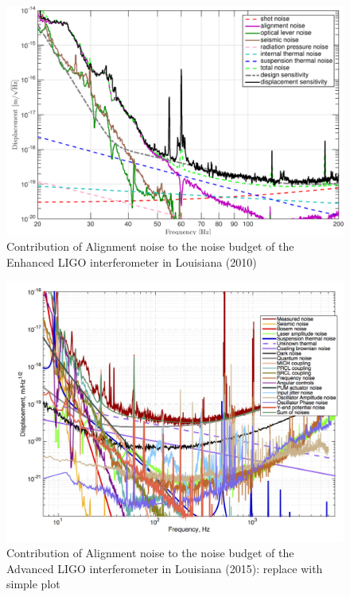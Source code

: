 \begin{figure}[h]
  \centering
    \includegraphics[width=\columnwidth]{Figures/S6_NB.pdf}
    \caption{Contribution of Alignment noise to the noise budget of the
    Enhanced LIGO interferometer in Louisiana (2010)}
    \label{fig:eLIGO}
\end{figure}

\begin{figure}[h]
    \includegraphics[width=\columnwidth]{Figures/darm_nb.png}
    \caption{Contribution of Alignment noise to the noise budget of the
    Advanced LIGO interferometer in Louisiana (2015): replace with simple plot}
    \label{fig:aLIGO}
\end{figure}


